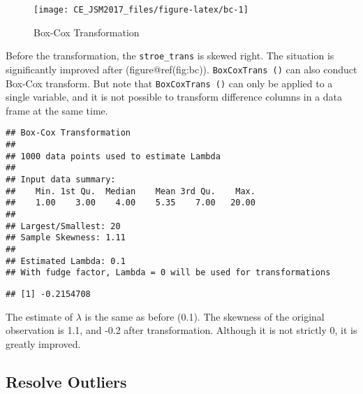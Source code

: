 \documentclass[
]{article}
\newenvironment{Shaded}{\begin{snugshade}}{\end{snugshade}}
\newcommand{\KeywordTok}[1]{\textcolor[rgb]{0.13,0.29,0.53}{\textbf{#1}}}
\newcommand{\NormalTok}[1]{#1}
\newcommand{\OperatorTok}[1]{\textcolor[rgb]{0.81,0.36,0.00}{\textbf{#1}}}
\begin{document}
\begin{figure}

{\centering \texttt{[image: CE\_JSM2017\_files/figure-latex/bc-1]} 

}

\caption{Box-Cox Transformation}\label{fig:bc}
\end{figure}

Before the transformation, the \texttt{stroe\_trans} is skewed right.
The situation is significantly improved after (figure@ref(fig:bc)).
\texttt{BoxCoxTrans\ ()} can also conduct Box-Cox transform. But note
that \texttt{BoxCoxTrans\ ()} can only be applied to a single variable,
and it is not possible to transform difference columns in a data frame
at the same time.

\begin{Shaded}
\end{Shaded}

\begin{verbatim}
## Box-Cox Transformation
## 
## 1000 data points used to estimate Lambda
## 
## Input data summary:
##    Min. 1st Qu.  Median    Mean 3rd Qu.    Max. 
##    1.00    3.00    4.00    5.35    7.00   20.00 
## 
## Largest/Smallest: 20 
## Sample Skewness: 1.11 
## 
## Estimated Lambda: 0.1 
## With fudge factor, Lambda = 0 will be used for transformations
\end{verbatim}

\begin{Shaded}
\end{Shaded}

\begin{verbatim}
## [1] -0.2154708
\end{verbatim}

The estimate of \(\lambda\) is the same as before (0.1). The skewness of
the original observation is 1.1, and -0.2 after transformation. Although
it is not strictly 0, it is greatly improved.

\hypertarget{resolve-outliers}{%
\subsection{Resolve Outliers}\label{resolve-outliers}}
\end{document}
